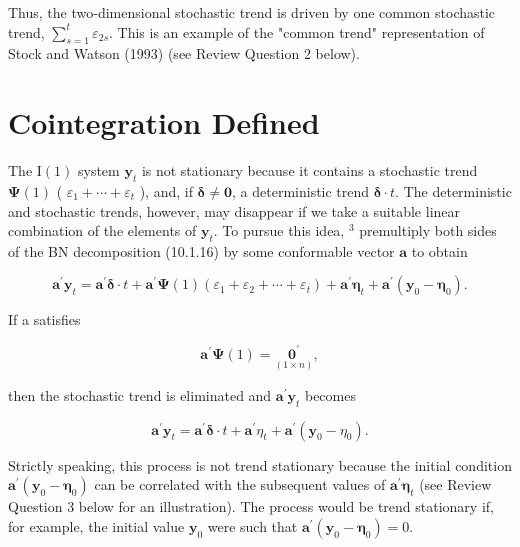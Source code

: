 \documentclass[10pt]{article}
\begin{document}
Thus, the two-dimensional stochastic trend is driven by one common stochastic trend, $\sum_{s=1}^{t} \varepsilon_{2 s}$. This is an example of the "common trend" representation of Stock and Watson (1993) (see Review Question 2 below).

\section*{Cointegration Defined}
The $\mathrm{I}(1)$ system $\mathbf{y}_{t}$ is not stationary because it contains a stochastic trend $\boldsymbol{\Psi}(1)$ ( $\varepsilon_{1}+\cdots+\varepsilon_{t}$ ), and, if $\boldsymbol{\delta} \neq \mathbf{0}$, a deterministic trend $\boldsymbol{\delta} \cdot t$. The deterministic and stochastic trends, however, may disappear if we take a suitable linear combination of the elements of $\mathbf{y}_{t}$. To pursue this idea, ${ }^{3}$ premultiply both sides of the BN decomposition (10.1.16) by some conformable vector $\mathbf{a}$ to obtain


\begin{equation*}
\mathbf{a}^{\prime} \mathbf{y}_{t}=\mathbf{a}^{\prime} \boldsymbol{\delta} \cdot t+\mathbf{a}^{\prime} \boldsymbol{\Psi}(1)\left(\varepsilon_{1}+\varepsilon_{2}+\cdots+\varepsilon_{t}\right)+\mathbf{a}^{\prime} \boldsymbol{\eta}_{t}+\mathbf{a}^{\prime}\left(\mathbf{y}_{0}-\boldsymbol{\eta}_{0}\right) . \tag{10.1.19}
\end{equation*}


If a satisfies


\begin{equation*}
\mathbf{a}^{\prime} \boldsymbol{\Psi}(1)=\underset{(1 \times n)}{\mathbf{0}^{\prime}}, \tag{10.1.20}
\end{equation*}


then the stochastic trend is eliminated and $\mathbf{a}^{\prime} \mathbf{y}_{t}$ becomes


\begin{equation*}
\mathbf{a}^{\prime} \mathbf{y}_{t}=\mathbf{a}^{\prime} \boldsymbol{\delta} \cdot t+\mathbf{a}^{\prime} \eta_{t}+\mathbf{a}^{\prime}\left(\mathbf{y}_{0}-\eta_{0}\right) . \tag{10.1.21}
\end{equation*}


Strictly speaking, this process is not trend stationary because the initial condition $\mathbf{a}^{\prime}\left(\mathbf{y}_{0}-\boldsymbol{\eta}_{0}\right)$ can be correlated with the subsequent values of $\mathbf{a}^{\prime} \boldsymbol{\eta}_{t}$ (see Review Question 3 below for an illustration). The process would be trend stationary if, for example, the initial value $\mathbf{y}_{0}$ were such that $\mathbf{a}^{\prime}\left(\mathbf{y}_{0}-\boldsymbol{\eta}_{0}\right)=0$.
\end{document}
